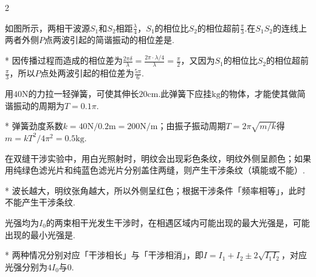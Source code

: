 \begin{paracol}{2}
    \begin{problem}[光程和光程差][3]
        如图所示，两相干波源$S_1$和$S_2$相距$\frac{\lambda}{4}$，$S_1$的相位比$S_2$的相位超前$\frac{\pi}{3}$.在$S_1S_2$的连线上两者外侧$P$点两波引起的简谐振动的相位差是.
    \end{problem}
\switchcolumn\centering
\vfill
{}
\vfill
\end{paracol}
\begin{solution}*
    因传播过程而造成的相位差为$\frac{2\pi\delta}{\lambda}=\frac{2\pi\cdot\lambda/4}{\lambda}=\frac{\pi}{2}$，又因为$S_1$的相位比$S_2$的相位超前$\frac{\pi}{3}$，所以$P$点处两波引起的相位差为$\frac{5\pi}6$.
\end{solution}

\begin{problem}[简谐振动][3]
    用$40\mathrm{N}$的力拉一轻弹簧，可使其伸长$20\mathrm{cm}$.此弹簧下应挂$\mathrm{kg}$的物体，才能使其做简谐振动的周期为$T=0.1\pi$.
\end{problem}
\begin{solution}*
    弹簧劲度系数$k=40\mathrm{N}/0.2\mathrm{m}=200\mathrm{N/m}$；由振子振动周期$T=2\pi\sqrt{m/k}$得$m=kT^2/4\pi^2=0.5\mathrm{kg}$.
\end{solution}

\begin{problem}[光的相干条件][3]
    在双缝干涉实验中，用白光照射时，明纹会出现彩色条纹，明纹外侧呈颜色；如果用纯绿色滤光片和纯蓝色滤光片分别盖住两缝，则产生干涉条纹（填能或不能）.
\end{problem}
\begin{solution}*
    波长越大，明纹张角越大，所以外侧呈红色；根据干涉条件「频率相等」，此时不能产生干涉条纹.
\end{solution}

\begin{problem}[相干光的叠加后的光强分布][3]
    光强均为$I_0$的两束相干光发生干涉时，在相遇区域内可能出现的最大光强是，可能出现的最小光强是.
\end{problem}
\begin{solution}*
    两种情况分别对应「干涉相长」与「干涉相消」，即$I=I_1+I_2\pm 2\sqrt{I_1I_2}$，对应光强分别为$4I_0$与$0$.
\end{solution}

